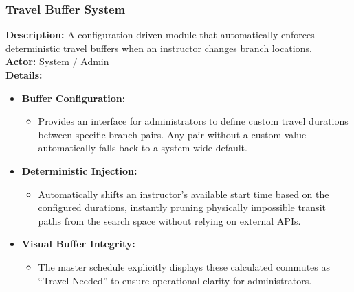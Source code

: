 \subsubsection{Travel Buffer System}
\textbf{Description:} A configuration-driven module that automatically enforces deterministic travel buffers when an instructor changes branch locations. \\
\textbf{Actor:} System / Admin \\
\textbf{Details:}
\begin{itemize}
    \item \textbf{Buffer Configuration:}
    \begin{itemize}
        \item Provides an interface for administrators to define custom travel durations between specific branch pairs. Any pair without a custom value automatically falls back to a system-wide default.
    \end{itemize}
    
    \item \textbf{Deterministic Injection:}
    \begin{itemize}
        \item Automatically shifts an instructor's available start time based on the configured durations, instantly pruning physically impossible transit paths from the search space without relying on external APIs.
    \end{itemize}
    
    \item \textbf{Visual Buffer Integrity:}
    \begin{itemize}
        \item The master schedule explicitly displays these calculated commutes as \enquote{Travel Needed} to ensure operational clarity for administrators.
    \end{itemize}
\end{itemize}

